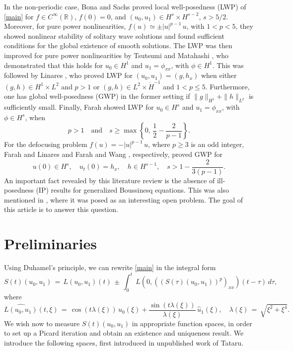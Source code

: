 \documentclass{amsart}
\begin{document}
In the non-periodic case, Bona and Sachs \cite{BS} proved local well-posedness (LWP) of \eqref{main} for $f\in C^\infty(\mathbb{R})$, $f(0)=0$, and $(u_0,u_1)\in H^s \times H^{s-2}$, $s>5/2$. Moreover, for pure power nonlinearities, $f(u)\simeq\pm |u|^{p-1}\,u$, with $1<p<5$, they showed nonlinear stability of solitary wave solutions and found sufficient conditions for the global existence of smooth solutions.  The LWP was then improved for pure power nonlinearities by Tsutsumi and Matahashi \cite{TM}, who demonstrated that this holds for $u_0\in H^1$ and $u_1=\phi_{xx}$, with $\phi\in H^1$. This was followed by Linares \cite{L93}, who proved LWP for $(u_0,u_1)=(g, h_x)$ when either $(g,h) \in H^1\times L^2$ and $p>1$ or $(g,h) \in L^2 \times \dot{H}^{-1}$  and $1<p\leq 5$. Furthermore, one has global well-posedness (GWP) in the former setting if $\|g\|_{H^1}+\|h\|_{L^2}$ is sufficiently small. Finally, Farah \cite{F092} showed LWP for $u_0\in H^s$ and $u_1=\phi_{xx}$, with $\phi\in H^s$, when
\[
p>1 \quad \text{and} \quad s\geq \max \left\{0,\,\frac{1}{2}-\frac{2}{p-1}\right\}. \]
For the defocusing problem $f(u)= -|u|^{p-1}\,u$, where $p\geq 3$ is an odd integer, Farah and Linares \cite{FL} and Farah and Wang \cite{FW12}, respectively, proved GWP for 
\[
u(0)\in H^s, \quad u_t(0)=h_x , \quad h \in H^{s-1}, \quad s> 1-\frac{2}{3(p-1)}.
\]
An important fact revealed by this literature review is the absence of ill-posedness (IP) results for generalized Boussinesq equations. This  was also mentioned in  \cite{FW12}, where it was posed as an interesting open problem. The goal of this article is to answer this question. 

\section{Preliminaries}
Using Duhamel's principle, we can rewrite \eqref{main} in the integral form
\begin{equation}
S(t)(u_0,u_1)\,=\,L(u_0,u_1)(t)\,\pm\, \int_0^t\,L \left( 0,\left((S(\tau)(u_0,u_1))^p\right)_{xx}\right)(t-\tau)\,d\tau,
\end{equation}
where
\begin{equation}
\widehat{L(u_0,u_1)}(t,\xi)\,=\,\cos(t \lambda(\xi))\, \widehat{u}_0(\xi)+\frac{\sin(t \lambda(\xi))}{\lambda(\xi)} \,\widehat{u}_1(\xi), \quad \lambda(\xi)\,=\,\sqrt{\xi^2+\xi^4}.
\label{L}
\end{equation}
We wish now to measure $S(t)(u_{0}, u_{1})$ in appropriate function spaces, in order to set up a Picard iteration and obtain an existence and uniqueness result.  
We introduce the following spaces, first introduced in unpublished work of Tataru.
\end{document}
